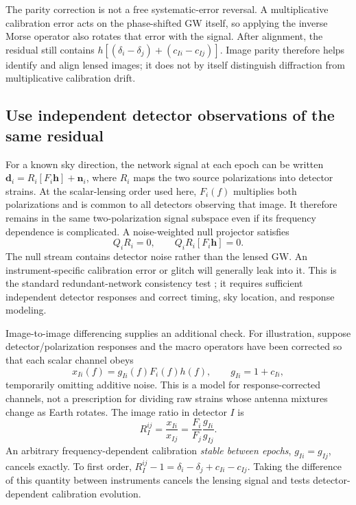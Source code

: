 The parity correction is not a free systematic-error reversal. A multiplicative
calibration error acts on the phase-shifted GW itself, so applying the inverse
Morse operator also rotates that error with the signal. After alignment, the
residual still contains $h[(\delta_i-\delta_j)+(c_{Ii}-c_{Ij})]$.
Image parity therefore helps identify and align lensed images; it does not
by itself distinguish diffraction from multiplicative calibration drift.

\subsection{Use independent detector observations of the same residual}

For a known sky direction, the network signal at each epoch can be written
\(\boldsymbol d_i=R_i[F_i\boldsymbol h]+\boldsymbol n_i\), where \(R_i\)
maps the two source polarizations into detector strains. At the scalar-lensing
order used here, \(F_i(f)\) multiplies both polarizations and is common to all
detectors observing that image. It therefore remains in the same two-polarization
signal subspace even if its frequency dependence is complicated. A noise-weighted
null projector satisfies
\begin{equation}
 Q_iR_i=0,\qquad Q_iR_i[F_i\boldsymbol h]=0.
\end{equation}
The null stream contains detector noise rather than the lensed GW. An
instrument-specific calibration error or glitch will generally leak into it.
This is the standard redundant-network consistency test
\cite{wenschutz2005,schutz2020}; it requires sufficient independent detector
responses and correct timing, sky location, and response modeling.

Image-to-image differencing supplies an additional check. For illustration,
suppose detector/polarization responses and the macro operators have been
corrected so that each scalar channel obeys
\begin{equation}
 x_{Ii}(f)=g_{Ii}(f)F_i(f)h(f),\qquad g_{Ii}=1+c_{Ii},
 \label{eq:sys_scalar}
\end{equation}
temporarily omitting additive noise. This is a model for response-corrected
channels, not a prescription for dividing raw strains whose antenna mixtures
change as Earth rotates. The image ratio in detector \(I\) is
\begin{equation}
 R_I^{ij}=\frac{x_{Ii}}{x_{Ij}}
 =\frac{F_i}{F_j}\frac{g_{Ii}}{g_{Ij}}.
\end{equation}
An arbitrary frequency-dependent calibration \emph{stable between epochs},
\(g_{Ii}=g_{Ij}\), cancels exactly. To first order,
\(R_I^{ij}-1=\delta_i-\delta_j+c_{Ii}-c_{Ij}\).
Taking the difference of this quantity between instruments cancels the lensing
signal and tests detector-dependent calibration evolution.


